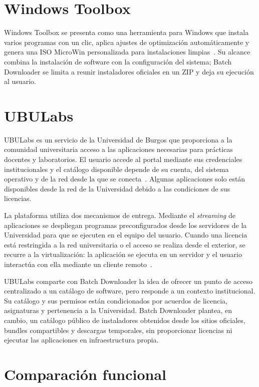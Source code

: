 \section{Windows Toolbox}

Windows Toolbox se presenta como una herramienta para Windows que instala varios programas con un clic, aplica ajustes de optimización automáticamente y genera una ISO MicroWin personalizada para instalaciones limpias~\cite{windows-toolbox}. Su alcance combina la instalación de software con la configuración del sistema; Batch Downloader se limita a reunir instaladores oficiales en un ZIP y deja su ejecución al usuario.

\section{UBULabs}

UBULabs es un servicio de la Universidad de Burgos que proporciona a la comunidad universitaria acceso a las aplicaciones necesarias para prácticas docentes y laboratorios. El usuario accede al portal mediante sus credenciales institucionales y el catálogo disponible depende de su cuenta, del sistema operativo y de la red desde la que se conecta~\cite{ubulabs}. Algunas aplicaciones solo están disponibles desde la red de la Universidad debido a las condiciones de sus licencias.

La plataforma utiliza dos mecanismos de entrega. Mediante el \emph{streaming} de aplicaciones se despliegan programas preconfigurados desde los servidores de la Universidad para que se ejecuten en el equipo del usuario. Cuando una licencia está restringida a la red universitaria o el acceso se realiza desde el exterior, se recurre a la virtualización: la aplicación se ejecuta en un servidor y el usuario interactúa con ella mediante un cliente remoto~\cite{ubulabs}.

UBULabs comparte con Batch Downloader la idea de ofrecer un punto de acceso centralizado a un catálogo de software, pero responde a un contexto institucional. Su catálogo y sus permisos están condicionados por acuerdos de licencia, asignaturas y pertenencia a la Universidad. Batch Downloader plantea, en cambio, un catálogo público de instaladores obtenidos desde los sitios oficiales, bundles compartibles y descargas temporales, sin proporcionar licencias ni ejecutar las aplicaciones en infraestructura propia.

\section{Comparación funcional}

